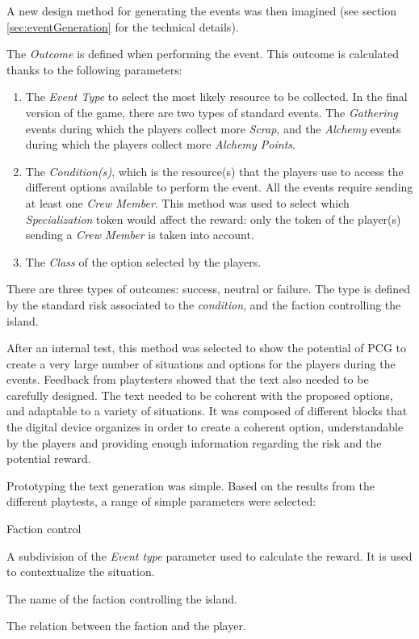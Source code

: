 A new design method for generating the events was then imagined (see section \ref{sec:eventGeneration} for the technical details).

The \textit{Outcome} is defined when performing the event. This outcome is calculated thanks to the following parameters:
\begin{enumerate}
\item The \textit{Event Type} to select the most likely resource to be collected. In the final version of the game, there are two types of standard events. The \textit{Gathering} events during which the players collect more \textit{Scrap}, and the \textit{Alchemy} events during which the players collect more \textit{Alchemy Points}.
\item The \textit{Condition(s)}, which is the resource(s) that the players use to access the different options available to perform the event. All the events require sending at least one \textit{Crew Member}. This method was used to select which \textit{Specialization} token would affect the reward: only the token of the player(s) sending a \textit{Crew Member} is taken into account.
\item The \textit{Class} of the option selected by the players. 
\end{enumerate}
There are three types of outcomes: success, neutral or failure. The type is defined by the standard risk associated to the \textit{condition}, and the faction controlling the island. 

After an internal test, this method was selected to show the potential of PCG to create a very large number of situations and options for the players during the events. Feedback from playtesters showed that the text also needed to be carefully designed. The text needed to be coherent with the proposed options, and adaptable to a variety of situations. It was composed of different blocks that the digital device organizes in order to create a coherent option, understandable by the players and providing enough information regarding the risk and the potential reward.

Prototyping the text generation was simple. Based on the results from the different playtests, a range of simple parameters were selected:
\begin{labeling}{Faction control}
\item [\textbf{Location Type}] A subdivision of the \textit{Event type} parameter used to calculate the reward. It is used to contextualize the situation.
\item [\textbf{Faction control}] The name of the faction controlling the island.
\item [\textbf{Allegiance}] The relation between the faction and the player.
\end{labeling}

